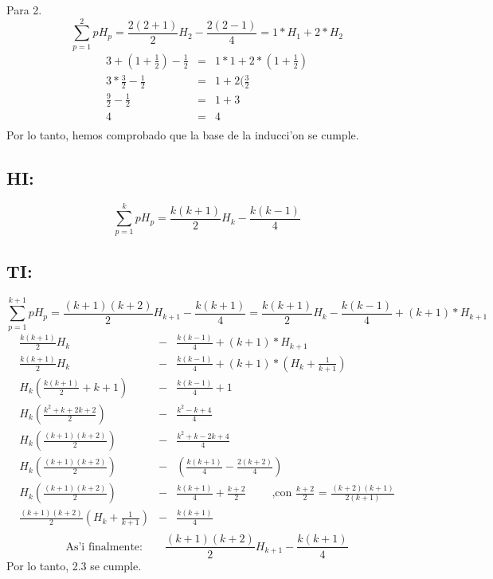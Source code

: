 \documentclass[11pt]{utalcaDoc}
\numberwithin{equation}{section}
\begin{document}
Para 2.
\begin{equation*}
 \sum_{p=1}^{2} pH_{p} = \frac{2(2+1)}{2}H_{2} - \frac{2(2-1)}{4} = 1*H_{1} + 2*H_{2}
\end{equation*}
\begin{eqnarray*}
 3 + (1 + \frac{1}{2}) - \frac{1}{2} &=& 1*1 + 2*(1 + \frac{1}{2})\\
 3*\frac{3}{2} - \frac{1}{2} &=& 1 + 2(\frac{3}{2}\\
 \frac{9}{2} - \frac{1}{2} &=& 1 + 3\\
 4 &=& 4\\
\end{eqnarray*}
Por lo tanto, hemos comprobado que la base de la inducci'on se cumple.

\subsection{HI:}
\begin{equation*}
 \sum_{p=1}^{k} pH_{p} = \frac{k(k+1)}{2}H_{k} - \frac{k(k-1)}{4}
\end{equation*}

\subsection{TI:}
\begin{equation*}
 \sum_{p=1}^{k+1} pH_{p} = \frac{(k+1)(k+2)}{2}H_{k+1} - \frac{k(k+1)}{4} =
 \frac{k(k+1)}{2}H_{k} - \frac{k(k-1)}{4} + (k+1)*H_{k+1}
\end{equation*}
\begin{eqnarray*}
 \frac{k(k+1)}{2}H_{k} &-& \frac{k(k-1)}{4} + (k+1)*H_{k+1}\\
 \frac{k(k+1)}{2}H_{k} &-& \frac{k(k-1)}{4} + (k+1)*\left(H_{k} + \frac{1}{k+1}\right)\\
  H_{k}\left( \frac{k(k+1)}{2} + k+1 \right) &-& \frac{k(k-1)}{4} + 1\\
  H_{k}\left( \frac{k^2 + k + 2 k + 2}{2}\right) &-& \frac{k^2 - k + 4}{4}\\
  H_{k}\left( \frac{(k+1)(k+2)}{2}\right) &-& \frac{k^2 + k - 2 k + 4}{4}\\  
  H_{k}\left( \frac{(k+1)(k+2)}{2}\right) &-& \left( \frac{k(k+1)}{4} - \frac{2(k+2)}{4} \right)\\
  H_{k}\left( \frac{(k+1)(k+2)}{2}\right) &-& \frac{k(k+1)}{4} + \frac{k+2}{2} 
  \qquad\textrm{ ,con }\frac{k+2}{2} \textrm{ = }\frac{(k+2)(k+1)}{2(k+1)} \\ 
  \frac{(k+1)(k+2)}{2} \left( H_{k} + \frac{1}{k+1} \right) &-& \frac{k(k+1)}{4}\\
\end{eqnarray*}
\begin{equation*}
  \textrm{As'i finalmente:}\qquad\frac{(k+1)(k+2)}{2}H_{k+1} - \frac{k(k+1)}{4}
\end{equation*}
Por lo tanto, 2.3 se cumple.
\end{document}
